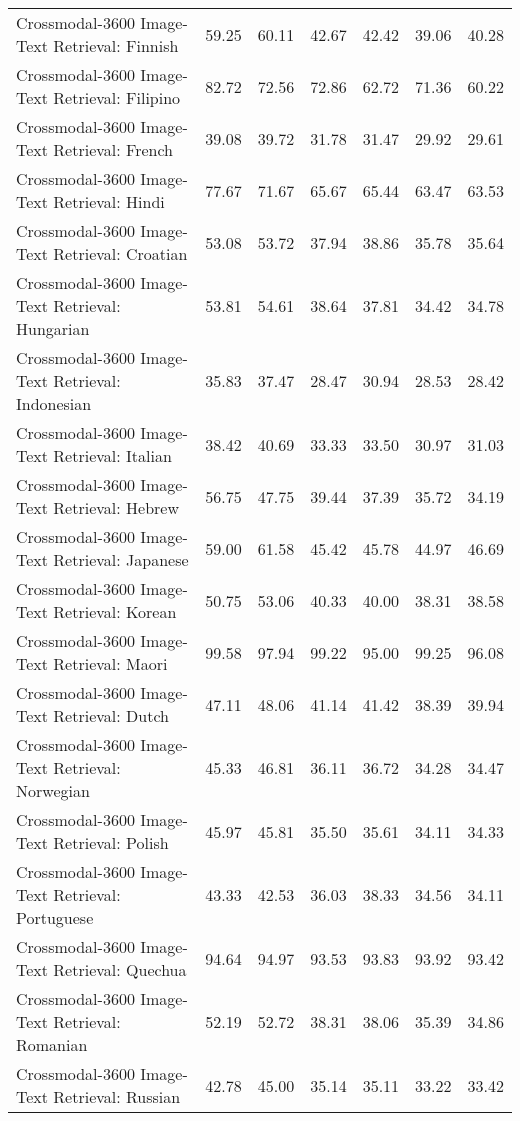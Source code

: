 {\begin{longtable}{l|rr|rr|rr}
Crossmodal-3600 Image-Text Retrieval: Finnish & 59.25 & 60.11 & 42.67 & 42.42 & 39.06 & 40.28 \\
Crossmodal-3600 Image-Text Retrieval: Filipino & 82.72 & 72.56 & 72.86 & 62.72 & 71.36 & 60.22 \\
Crossmodal-3600 Image-Text Retrieval: French & 39.08 & 39.72 & 31.78 & 31.47 & 29.92 & 29.61 \\
Crossmodal-3600 Image-Text Retrieval: Hindi & 77.67 & 71.67 & 65.67 & 65.44 & 63.47 & 63.53 \\
Crossmodal-3600 Image-Text Retrieval: Croatian & 53.08 & 53.72 & 37.94 & 38.86 & 35.78 & 35.64 \\
Crossmodal-3600 Image-Text Retrieval: Hungarian & 53.81 & 54.61 & 38.64 & 37.81 & 34.42 & 34.78 \\
Crossmodal-3600 Image-Text Retrieval: Indonesian & 35.83 & 37.47 & 28.47 & 30.94 & 28.53 & 28.42 \\
Crossmodal-3600 Image-Text Retrieval: Italian & 38.42 & 40.69 & 33.33 & 33.50 & 30.97 & 31.03 \\
Crossmodal-3600 Image-Text Retrieval: Hebrew & 56.75 & 47.75 & 39.44 & 37.39 & 35.72 & 34.19 \\
Crossmodal-3600 Image-Text Retrieval: Japanese & 59.00 & 61.58 & 45.42 & 45.78 & 44.97 & 46.69 \\
Crossmodal-3600 Image-Text Retrieval: Korean & 50.75 & 53.06 & 40.33 & 40.00 & 38.31 & 38.58 \\
Crossmodal-3600 Image-Text Retrieval: Maori & 99.58 & 97.94 & 99.22 & 95.00 & 99.25 & 96.08 \\
Crossmodal-3600 Image-Text Retrieval: Dutch & 47.11 & 48.06 & 41.14 & 41.42 & 38.39 & 39.94 \\
Crossmodal-3600 Image-Text Retrieval: Norwegian & 45.33 & 46.81 & 36.11 & 36.72 & 34.28 & 34.47 \\
Crossmodal-3600 Image-Text Retrieval: Polish & 45.97 & 45.81 & 35.50 & 35.61 & 34.11 & 34.33 \\
Crossmodal-3600 Image-Text Retrieval: Portuguese & 43.33 & 42.53 & 36.03 & 38.33 & 34.56 & 34.11 \\
Crossmodal-3600 Image-Text Retrieval: Quechua & 94.64 & 94.97 & 93.53 & 93.83 & 93.92 & 93.42 \\
Crossmodal-3600 Image-Text Retrieval: Romanian & 52.19 & 52.72 & 38.31 & 38.06 & 35.39 & 34.86 \\
Crossmodal-3600 Image-Text Retrieval: Russian & 42.78 & 45.00 & 35.14 & 35.11 & 33.22 & 33.42 \\

\end{longtable}}
